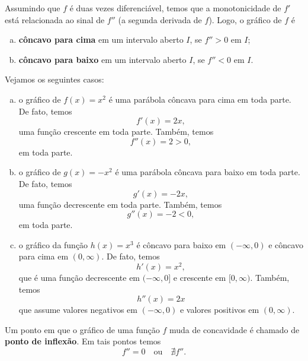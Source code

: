 Assumindo que $f$ é duas vezes diferenciável, temos que a monotonicidade de $f'$ está relacionada ao sinal de $f''$ (a segunda derivada de $f$). Logo, o gráfico de $f$ é
\begin{enumerate}[a)]
\item {\bf côncavo para cima} em um intervalo aberto $I$, se $f'' > 0$ em $I$;
\item {\bf côncavo para baixo} em um intervalo aberto $I$, se $f'' < 0$ em $I$.
\end{enumerate}

\begin{ex}
  Vejamos os seguintes casos:
  \begin{enumerate}[a)]
  \item o gráfico de $f(x) = x^2$ é uma parábola côncava para cima em toda parte. De fato, temos
    \begin{equation}
      f'(x) = 2x,
    \end{equation}
    uma função crescente em toda parte. Também, temos
    \begin{equation}
      f''(x) = 2 > 0,
    \end{equation}
    em toda parte.
  \item o gráfico de $g(x) = -x^2$ é uma parábola côncava para baixo em toda parte. De fato, temos
    \begin{equation}
      g'(x) = -2x,
    \end{equation}
    uma função decrescente em toda parte. Também, temos
    \begin{equation}
      g''(x) = -2 < 0,
    \end{equation}
    em toda parte.
  \item o gráfico da função $h(x) = x^3$ é côncavo para baixo em $(-\infty, 0)$ e côncavo para cima em $(0, \infty)$. De fato, temos
    \begin{equation}
      h'(x) = x^2,
    \end{equation}
    que é uma função decrescente em $(-\infty, 0]$ e crescente em $[0, \infty)$. Também, temos
    \begin{equation}
      h''(x) = 2x
    \end{equation}
    que assume valores negativos em $(-\infty, 0)$ e valores positivos em $(0, \infty)$.
  \end{enumerate}
\end{ex}

Um ponto em que o gráfico de uma função $f$ muda de concavidade é chamado de {\bf ponto de inflexão}. Em tais pontos temos
\begin{equation}
  f'' = 0\quad\text{ou}\quad\nexists f''.
\end{equation}

